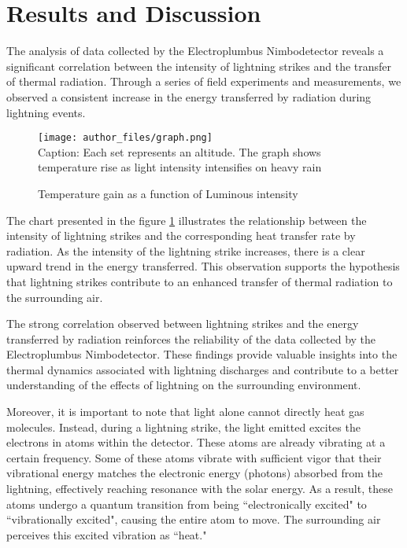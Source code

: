 \documentclass[english]{cenarticle} %
\begin{document}
\section{Results and Discussion}
%
The analysis of data collected by the Electroplumbus Nimbodetector reveals a significant correlation between the intensity of lightning strikes and the transfer of thermal radiation. Through a series of field experiments and measurements, we observed a consistent increase in the energy transferred by radiation during lightning events.\par
%
\begin{figure}[!h]
  \caption{Temperature gain as a function of Luminous intensity}
  \texttt{[image: author\_files/graph.png]}\\
  {\footnotesize Caption: Each set represents an altitude. The graph shows temperature rise as light intensity intensifies on heavy rain}
  \label{fig:graph}
\end{figure}
%
The chart presented in the figure \ref{fig:graph} illustrates the relationship between the intensity of lightning strikes and the corresponding heat transfer rate by radiation. As the intensity of the lightning strike increases, there is a clear upward trend in the energy transferred. This observation supports the hypothesis that lightning strikes contribute to an enhanced transfer of thermal radiation to the surrounding air.\par
%
The strong correlation observed between lightning strikes and the energy transferred by radiation reinforces the reliability of the data collected by the Electroplumbus Nimbodetector. These findings provide valuable insights into the thermal dynamics associated with lightning discharges and contribute to a better understanding of the effects of lightning on the surrounding environment.\par
%
Moreover, it is important to note that light alone cannot directly heat gas molecules. Instead, during a lightning strike, the light emitted excites the electrons in atoms within the detector. These atoms are already vibrating at a certain frequency. Some of these atoms vibrate with sufficient vigor that their vibrational energy matches the electronic energy (photons) absorbed from the lightning, effectively reaching resonance with the solar energy. As a result, these atoms undergo a quantum transition from being ``electronically excited" to ``vibrationally excited", causing the entire atom to move. The surrounding air perceives this excited vibration as ``heat."\par
\end{document}
